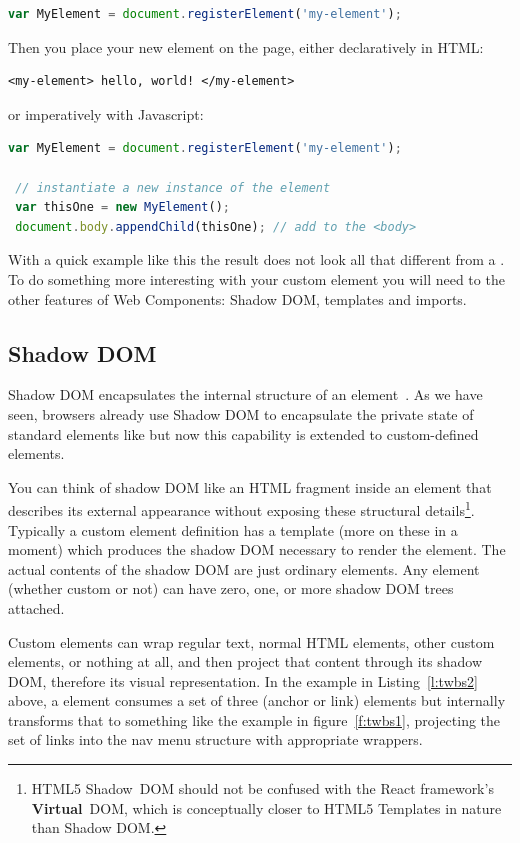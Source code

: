 \begin{lstlisting}[language=JavaScript,numbers=none]
 var MyElement = document.registerElement('my-element');
\end{lstlisting}

Then you place your new element on the page, either declaratively in HTML:

\begin{lstlisting}[language=HTML5,numbers=none]
 <my-element> hello, world! </my-element>
\end{lstlisting}

or imperatively with Javascript:

\begin{lstlisting}[language=JavaScript,numbers=none]
 var MyElement = document.registerElement('my-element');

 // instantiate a new instance of the element
 var thisOne = new MyElement();      
 document.body.appendChild(thisOne); // add to the <body>
\end{lstlisting}

With a quick example like this the result does not look all that different from a .
To do something more interesting with your custom element you will need to the other features of Web Components: Shadow DOM, templates and imports.

\subsection{Shadow DOM}
Shadow DOM encapsulates the internal structure of an element~\cite{w3ccontributors2015}. 
As we have seen, browsers already use Shadow DOM to encapsulate the private state of standard elements like  but now this capability is extended to custom-defined elements.

You can think of shadow DOM like an HTML fragment inside an element that describes its external appearance without exposing these structural details\footnote{
HTML5 Shadow~DOM should not be confused with the React framework's \textbf{Virtual}~DOM, which is conceptually closer to HTML5 Templates in nature than Shadow DOM.}. 
Typically a custom element definition has a template (more on these in a moment) which produces the shadow DOM necessary to render the element.
The actual contents of the shadow DOM are just ordinary elements.
Any element (whether custom or not) can have zero, one, or more shadow DOM trees attached.

Custom elements can wrap regular text, normal HTML elements, other custom elements, or nothing at all,
and then project that content through its shadow DOM, 
therefore its visual representation.
In the example in Listing~\ref{l:twbs2} above, 
a \textbf{} element consumes a set of three 
\textbf{} (anchor or link) elements but internally transforms that to something like the example in figure~\ref{f:twbs1}, 
projecting the set of links into the nav menu structure with appropriate wrappers.

